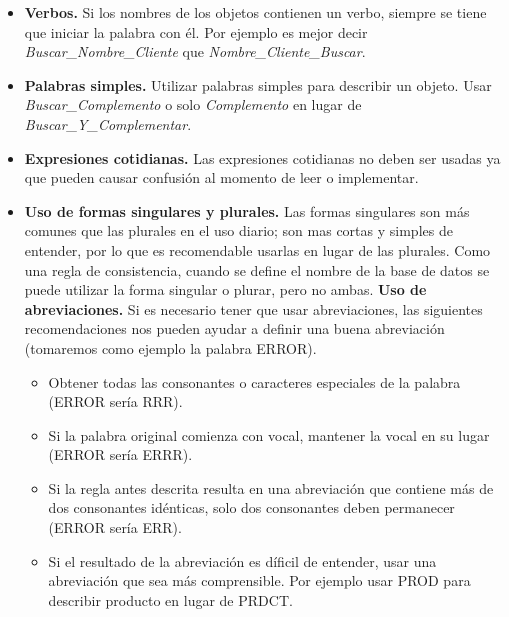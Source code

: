 \begin{itemize}
\item \textbf{Verbos.} Si los nombres de los objetos contienen un verbo, siempre se tiene que iniciar la palabra con él. Por ejemplo
es mejor decir \textit{Buscar\_Nombre\_Cliente} que \textit{Nombre\_Cliente\_Buscar}.
\item \textbf{Palabras simples.} Utilizar palabras simples para describir un objeto. Usar \textit{Buscar\_Complemento} o solo \textit{Complemento} 
en lugar de \textit{Buscar\_Y\_Complementar}.
\item \textbf{Expresiones cotidianas.} Las expresiones cotidianas no deben ser usadas ya que pueden causar confusión al momento de leer o implementar.
\item \textbf{Uso de formas singulares y plurales.} Las formas singulares son más comunes que las plurales en el uso diario; son mas cortas 
y simples de entender, por lo que es recomendable usarlas en lugar de las plurales. Como una regla de consistencia, cuando se define el 
nombre de la base de datos se puede utilizar la forma singular o plurar, pero no ambas.
\tem \textbf{Uso de abreviaciones.} Si es necesario tener que usar abreviaciones, las siguientes recomendaciones nos pueden ayudar a 
definir una buena abreviación (tomaremos como ejemplo la palabra ERROR).
\begin{itemize}
\item Obtener todas las consonantes o caracteres especiales de la palabra (ERROR sería RRR).
\item Si la palabra original comienza con vocal, mantener la vocal en su lugar (ERROR sería ERRR).
\item Si la regla antes descrita resulta en una abreviación que contiene más de dos consonantes idénticas, solo dos consonantes deben permanecer (ERROR sería ERR).
\item Si el resultado de la abreviación es díficil de entender, usar una abreviación que sea más comprensible. Por ejemplo usar PROD para describir producto en lugar de PRDCT.
\end{itemize}




\end{itemize}


\cleardoublepage

